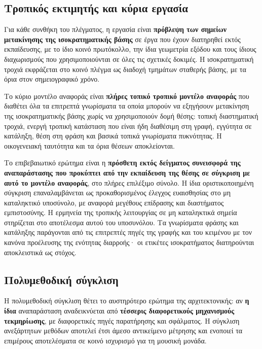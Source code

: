 \documentclass[11pt,a4paper]{article}
\begin{document}
\subsection{Τροπικός εκτιμητής και κύρια εργασία}\label{app:stats-trop}

Για κάθε συνθήκη του πλέγματος, η εργασία είναι \textbf{πρόβλεψη των σημείων μετακίνησης της ισοκρατηματικής βάσης} σε έργα που έχουν διατηρηθεί εκτός εκπαίδευσης, με το ίδιο κοινό πρωτόκολλο, την ίδια γεωμετρία εξόδου και τους ίδιους διαχωρισμούς που χρησιμοποιούνται σε όλες τις σχετικές δοκιμές. Η ισοκρατηματική τροχιά εκφράζεται στο κοινό πλέγμα ως διαδοχή τμημάτων σταθερής βάσης, με τα όρια στον σημειογραφικό χρόνο.

Το κύριο μοντέλο αναφοράς είναι \textbf{πλήρες τοπικό τροπικό μοντέλο αναφοράς} που διαθέτει όλα τα επιτρεπτά γνωρίσματα τα οποία μπορούν να εξηγήσουν μετακίνηση της ισοκρατηματικής βάσης χωρίς να χρησιμοποιούν δομή θέσης: τοπική διαστηματική τροχιά, ενεργή τροπική κατάσταση που είναι ήδη διαθέσιμη στη γραφή, εγγύτητα σε κατάληξη, θέση στη φράση και βασικά τοπικά γνωρίσματα πυκνότητας. Η οικογενειακή ταυτότητα και τα όρια θέσεων αποκλείονται.

Το επιβεβαιωτικό ερώτημα είναι η \textbf{πρόσθετη εκτός δείγματος συνεισφορά της αναπαράστασης που προκύπτει από την εκπαίδευση της θέσης σε σύγκριση με αυτό το μοντέλο αναφοράς}, στο πλήρες επιλέξιμο σύνολο. Η ίδια οριστικοποιημένη σύγκριση επαναλαμβάνεται ως προκαθορισμένος έλεγχος ευαισθησίας στο μη καταληκτικό υποσύνολο, με αναφορά μεγέθους επίδρασης και διαστήματος εμπιστοσύνης. Η ερμηνεία της τροπικής λειτουργίας σε μη καταληκτικά σημεία στηρίζεται στο αποτέλεσμα αυτού του υποσυνόλου. Τα γνωρίσματα φράσης και κατάληξης παράγονται από τις επιτρεπτές πηγές της γραφής και του κειμένου με τον κανόνα προέλευσης της ενότητας διαρροής· οι ετικέτες ισοκρατήματος διατηρούνται αποκλειστικά ως στόχος.

\subsection{Πολυμεθοδική σύγκλιση}\label{app:stats-convergence}

Η πολυμεθοδική σύγκλιση θέτει το αυστηρότερο ερώτημα της αρχιτεκτονικής: αν \textbf{η ίδια} αναπαράσταση αναδεικνύεται από \textbf{τέσσερις διαφορετικούς μηχανισμούς τεκμηρίωσης}, με διαφορετικές πηγές παρατήρησης και σφάλματος. Η σύγκλιση ανεξάρτητων μεθόδων αποτελεί έτσι άμεσο αντικείμενο μέτρησης και ενοποιεί τα επιμέρους αποτελέσματα σε κοινό ισχυρισμό για τη μουσική μονάδα.
\end{document}
